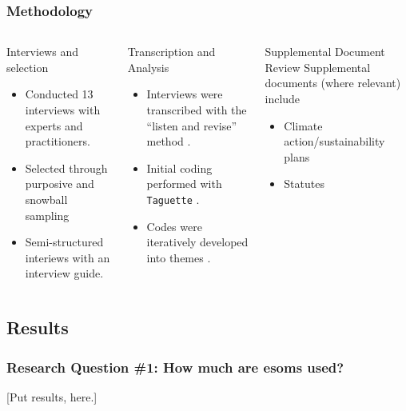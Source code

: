 \begin{frame}
    \frametitle{Methodology}


    \begin{columns}
        \column[t]{3.33cm}
        \begin{block}{Interviews and selection}
            \begin{itemize}[<+->]
                \item Conducted 13 interviews with experts and practitioners.
                \item Selected through purposive and snowball sampling
                \item Semi-structured interiews with an interview guide.
            \end{itemize}
        \end{block}
        \column[t]{3.33cm}
        \begin{block}{Transcription and Analysis}
            \begin{itemize}[<+->]
                \item Interviews were transcribed with the ``listen and revise''
                method \cite{battaglia_listen_2024}.
                \item Initial coding performed with \texttt{Taguette}
                \cite{rampin_taguette_2021}.
                \item Codes were iteratively developed into themes
                \cite{braun_using_2006}.
            \end{itemize}
        \end{block}
        \column[t]{3.33cm}
        \begin{block}{Supplemental Document Review}
            Supplemental documents (where relevant) include
            \begin{itemize}[<+->]
                \item Climate action/sustainability plans
                \item Statutes
            \end{itemize}
        \end{block}
    \end{columns}
\end{frame}

\subsection{Results}
\begin{frame}
    \frametitle{Research Question \#1: How much are \glspl{esom} used?}

    [Put results, here.]
\end{frame}

